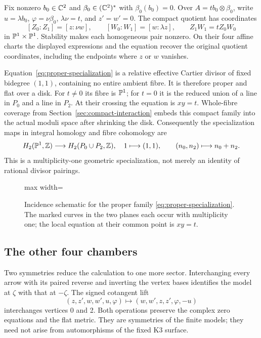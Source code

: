 Fix nonzero $b_0\in\mathbb C^2$ and
$\beta_0\in(\mathbb C^2)^*$ with $\beta_0(b_0)=0$.
Over $A=t b_0\otimes\beta_0$, write
$u=\lambda b_0$, $\varphi=\nu\beta_0$,
$\lambda\nu=t$, and $z'=w'=0$. The compact
quotient has coordinates
\begin{equation}\label{eq:proper-specialization}
 [Z_0:Z_1]=[z:\nu w],\qquad
 [W_0:W_1]=[w:\lambda z],\qquad
 Z_1W_1=tZ_0W_0
\end{equation}
in $\mathbb P^1\times\mathbb P^1$. Stability makes each
homogeneous pair nonzero. On their four affine charts
the displayed expressions and the equation recover
the original quotient coordinates, including the
endpoints where $z$ or $w$ vanishes.

Equation~\eqref{eq:proper-specialization} is a relative
effective Cartier divisor of fixed bidegree $(1,1)$,
containing no entire ambient fibre. It is therefore
proper and flat over a disk. For $t\ne0$ its fibre
is $\mathbb P^1$; for $t=0$ it is the reduced union of a
line in $P_0$ and a line in $P_2$. At their crossing
the equation is $xy=t$. Whole-fibre coverage from
Section~\ref{sec:compact-interaction} embeds this
compact family into the actual moduli space after
shrinking the disk. Consequently the specialization
maps in integral homology and fibre cohomology are
\begin{equation}\label{eq:reduced-specialization}
 H_2(\mathbb P^1,\mathbb Z)\longrightarrow H_2(P_0\cup P_2,\mathbb Z),
 \quad 1\longmapsto(1,1),\qquad
 (n_0,n_2)\longmapsto n_0+n_2.
\end{equation}
This is a multiplicity-one geometric specialization,
not merely an identity of rational divisor pairings.

\begin{figure}[tb]
\centering
\begin{adjustbox}{max width=\textwidth}

\end{adjustbox}
\caption{Incidence schematic for the proper family
\eqref{eq:proper-specialization}. The marked curves in the two
planes each occur with multiplicity one; the local equation
at their common point is $xy=t$.}
\label{fig:specialization}
\end{figure}

\subsection{The other four chambers}
Two symmetries reduce the calculation to one more
sector. Interchanging every arrow with its paired
reverse and inverting the vertex bases identifies
the model at $\zeta$ with that at $-\zeta$.
The signed cotangent lift
\[
 (z,z',w,w',u,\varphi)\longmapsto
 (w,w',z,z',\varphi,-u)
\]
interchanges vertices 0 and 2. Both operations preserve
the complex zero equations and the flat metric.
They are symmetries of the finite models; they need
not arise from automorphisms of the fixed K3 surface.

